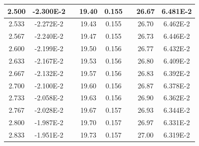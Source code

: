 \documentclass[article,12pt]{elsarticle}
\begin{document}
\begin{longtable}[c]{|c|c|cccccc}
2.500    & -2.300E-2 & \multicolumn{1}{c|}{} & \multicolumn{1}{c|}{19.40}   & \multicolumn{1}{c|}{0.155} & \multicolumn{1}{c|}{} & \multicolumn{1}{c|}{26.67}   & \multicolumn{1}{c|}{6.481E-2} \\ \hline
2.533    & -2.272E-2 & \multicolumn{1}{c|}{} & \multicolumn{1}{c|}{19.43}   & \multicolumn{1}{c|}{0.155} & \multicolumn{1}{c|}{} & \multicolumn{1}{c|}{26.70}   & \multicolumn{1}{c|}{6.462E-2} \\ \hline
2.567    & -2.240E-2 & \multicolumn{1}{c|}{} & \multicolumn{1}{c|}{19.47}   & \multicolumn{1}{c|}{0.155} & \multicolumn{1}{c|}{} & \multicolumn{1}{c|}{26.73}   & \multicolumn{1}{c|}{6.446E-2} \\ \hline
2.600    & -2.199E-2 & \multicolumn{1}{c|}{} & \multicolumn{1}{c|}{19.50}   & \multicolumn{1}{c|}{0.156} & \multicolumn{1}{c|}{} & \multicolumn{1}{c|}{26.77}   & \multicolumn{1}{c|}{6.432E-2} \\ \hline
2.633    & -2.167E-2 & \multicolumn{1}{c|}{} & \multicolumn{1}{c|}{19.53}   & \multicolumn{1}{c|}{0.156} & \multicolumn{1}{c|}{} & \multicolumn{1}{c|}{26.80}   & \multicolumn{1}{c|}{6.409E-2} \\ \hline
2.667    & -2.132E-2 & \multicolumn{1}{c|}{} & \multicolumn{1}{c|}{19.57}   & \multicolumn{1}{c|}{0.156} & \multicolumn{1}{c|}{} & \multicolumn{1}{c|}{26.83}   & \multicolumn{1}{c|}{6.392E-2} \\ \hline
2.700    & -2.100E-2 & \multicolumn{1}{c|}{} & \multicolumn{1}{c|}{19.60}   & \multicolumn{1}{c|}{0.156} & \multicolumn{1}{c|}{} & \multicolumn{1}{c|}{26.87}   & \multicolumn{1}{c|}{6.378E-2} \\ \hline
2.733    & -2.058E-2 & \multicolumn{1}{c|}{} & \multicolumn{1}{c|}{19.63}   & \multicolumn{1}{c|}{0.156} & \multicolumn{1}{c|}{} & \multicolumn{1}{c|}{26.90}   & \multicolumn{1}{c|}{6.362E-2} \\ \hline
2.767    & -2.028E-2 & \multicolumn{1}{c|}{} & \multicolumn{1}{c|}{19.67}   & \multicolumn{1}{c|}{0.157} & \multicolumn{1}{c|}{} & \multicolumn{1}{c|}{26.93}   & \multicolumn{1}{c|}{6.344E-2} \\ \hline
2.800    & -1.987E-2 & \multicolumn{1}{c|}{} & \multicolumn{1}{c|}{19.70}   & \multicolumn{1}{c|}{0.157} & \multicolumn{1}{c|}{} & \multicolumn{1}{c|}{26.97}   & \multicolumn{1}{c|}{6.331E-2} \\ \hline
2.833    & -1.951E-2 & \multicolumn{1}{c|}{} & \multicolumn{1}{c|}{19.73}   & \multicolumn{1}{c|}{0.157} & \multicolumn{1}{c|}{} & \multicolumn{1}{c|}{27.00}   & \multicolumn{1}{c|}{6.319E-2} \\ \hline

\end{longtable}
\end{document}
